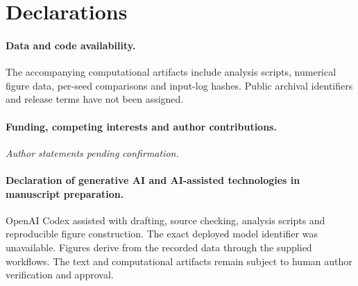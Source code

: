 \section*{Declarations}
\paragraph{Data and code availability.}
The accompanying computational artifacts include analysis scripts, numerical figure data, per-seed comparisons and input-log hashes. Public archival identifiers and release terms have not been assigned.
\paragraph{Funding, competing interests and author contributions.}
\textit{Author statements pending confirmation.}
\paragraph{Declaration of generative AI and AI-assisted technologies in manuscript preparation.}
OpenAI Codex assisted with drafting, source checking, analysis scripts and reproducible figure construction. The exact deployed model identifier was unavailable. Figures derive from the recorded data through the supplied workflows. The text and computational artifacts remain subject to human author verification and approval.
